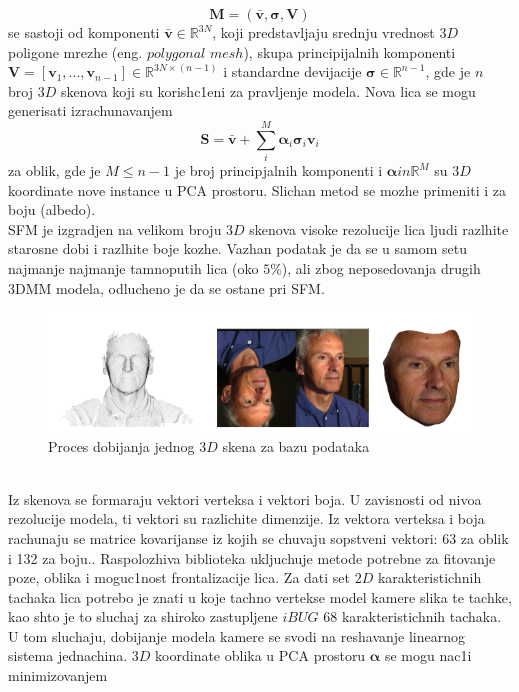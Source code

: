 \documentclass[a4paper, openany, oneside, 11pt]{book}
\begin{document}
\begin{equation}
\mathbf{M} = (\bar{\mathbf{v}}, \mathbf{\sigma}, \mathbf{V})
\end{equation}
se sastoji od komponenti $\bar{\mathbf{v}}\in\mathbb{R}^{3N}$, koji predstavljaju srednju vrednost $3D$ poligone mrezhe (eng. $polygonal$ $mesh$), skupa principijalnih komponenti $\mathbf{V}=[\mathbf{v}_1,...,\mathbf{v}_{n-1}]\in\mathbb{R}^{3N\times(n-1)}$ i standardne devijacije $\mathbf{\sigma}\in\mathbb{R}^{n-1}$, gde je $n$ broj $3D$ skenova koji su korish\-c1eni za pravljenje modela. Nova lica se mogu generisati izrachunavanjem
\begin{equation}
\mathbf{S} = \bar{\mathbf{v}}+\sum^M_i\mathbf{\alpha}_i\mathbf{\sigma}_i\mathbf{v}_i
\end{equation}
za oblik, gde je $M\le n-1$ je broj principjalnih komponenti i $\mathbf{\alpha}in\mathbb{R}^{M}$ su $3D$ koordinate nove instance u \acrshort{PCA} prostoru. Slichan metod se mozhe primeniti i za boju (albedo).\\
\acrshort{SFM} je izgradjen na velikom broju $3D$ skenova visoke rezolucije lica ljudi razlhite starosne dobi i razlhite boje kozhe. Vazhan podatak je da se u samom setu najmanje najmanje tamnoputih lica (oko $5\%$), ali zbog neposedovanja drugih \acrshort{3DMM} modela, odlucheno je da se ostane pri \acrshort{SFM}. 
\begin{figure}[h!]
\centering
  \includegraphics[scale=0.7]{res/Scan3DMM.png}
  \caption{Proces dobijanja jednog $3D$ skena za bazu podataka}
  \label{fig:2_6}
  \vspace{0pt}
\end{figure}\\
Iz skenova se formaraju vektori verteksa i vektori boja. U zavisnosti od nivoa rezolucije modela, ti vektori su razlichite dimenzije. Iz vektora verteksa i boja rachunaju se matrice kovarijanse iz kojih se chuvaju sopstveni vektori: 63 za oblik i 132 za boju.. Raspolozhiva biblioteka ukljuchuje metode potrebne za fitovanje poze, oblika i moguc1nost frontalizacije lica. Za dati set $2D$ karakteristichnih tachaka lica potrebo je znati u koje tachno vertekse model kamere slika te tachke, kao shto je to sluchaj za shiroko zastupljene $iBUG$ 68 karakteristichnih tachaka. U tom sluchaju, dobijanje modela kamere se svodi na reshavanje linearnog sistema jednachina. $3D$ koordinate oblika u \acrshort{PCA} prostoru $\mathbf{\alpha}$ se mogu nac1i minimizovanjem
\end{document}
